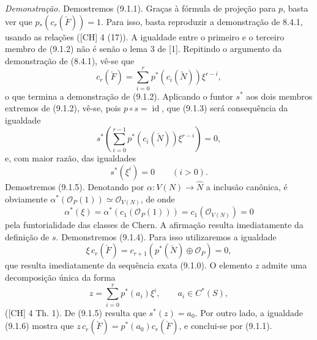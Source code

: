 \emph{Demonstração.} Demostremos (9.1.1). Graças à fórmula de projeção para $p$, basta ver que $p_*(c_r(\check F))=1$. Para isso, basta reproduzir a demonstração de 8.4.1, usando as relações ([CH] 4 (17)). A igualdade entre o primeiro e o terceiro membro de (9.1.2) não é senão o lema 3 de [1]. Repitindo o argumento da demonstração de (8.4.1), vê-se que
\[
c_r(\check F)=\sum_{i=0}^r p^*(c_i(\check N))\xi^{r-i},
\tag*{(9.1.2) bis}
\]
o que termina a demonstração de (9.1.2). Aplicando o funtor $s^*$ aos dois membros extremos de (9.1.2), vê-se, pois $p\circ s=\operatorname{id}$, que (9.1.3) será consequência da igualdade
\[
s^*\left(\sum_{i=0}^{r-1}p^*(c_i(\check N))\xi^{r-i}\right)=0,
\]
e, com maior razão, das igualdades
\[
s^*(\xi^i)=0\qquad(i>0).
\tag{9.1.5}
\]
Demostremos (9.1.5). Denotando por $\alpha:V(N)\to\widehat N$ a inclusão canônica, é obviamente $\alpha^*(\mathcal O_P(1))\simeq\mathcal O_{V(N)}$, de onde
\[
\alpha^*(\xi)=\alpha^*(c_1(\mathcal O_P(1)))=c_1(\mathcal O_{V(N)})=0
\]
pela funtorialidade das classes de Chern. A afirmação resulta imediatamente da definição de $s$. Demonstremos (9.1.4). Para isso utilizaremos a igualdade
\[
\xi\,c_r(\check F)=c_{r+1}(p^*(\check N)\oplus\mathcal O_P)=0,
\tag{9.1.6}
\]
que resulta imediatamente da sequência exata (9.1.0). O elemento $z$ admite uma decomposição única da forma
\[
z=\sum_{i=0}^r p^*(a_i)\xi^i,\qquad a_i\in C^*(S),
\]
([CH] 4 Th. 1). De (9.1.5) resulta que $s^*(z)=a_0$. Por outro lado, a igualdade (9.1.6) mostra que $z\,c_r(\check F)=p^*(a_0)c_r(\check F)$, e conclui-se por (9.1.1).
